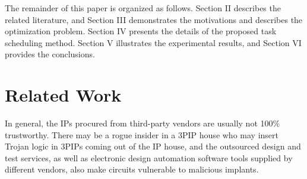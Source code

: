 \documentclass[10pt,journal, compsoc]{IEEEtran}
\begin{document}
The remainder of this paper is organized as follows. Section II describes the related literature, and Section III demonstrates the motivations and describes the optimization problem. Section IV presents the details of the proposed task scheduling method. Section V illustrates the experimental results, and Section VI provides the conclusions.







\section{Related Work}




In general, the IPs procured from third-party vendors are usually not 100\% trustworthy. There may be a rogue insider in a 3PIP house who may insert Trojan logic in 3PIPs coming out of the IP house, and the outsourced design and test services, as well as electronic design automation software tools supplied by different vendors, also make circuits vulnerable to malicious implants.%










\end{document}
